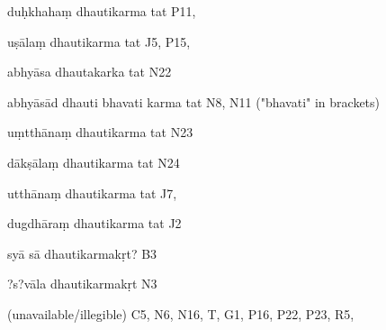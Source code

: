 \begin{marma}[hp02_009]
\begin{marma}[hp02_011]
\begin{marma}[hp02_24d]
\item[duḥkhahaṃ dhautikarma tat] P11, 
\item[uṣālaṃ dhautikarma tat] J5, P15, 
\item[abhyāsa dhautakarka tat] N22
\item[abhyāsād dhauti bhavati karma tat] N8, N11 ("bhavati" in brackets)
\item[uṃtthānaṃ dhautikarma tat] N23
\item[dākṣālaṃ dhautikarma tat] N24
\item[utthānaṃ dhautikarma tat] J7,
\item[dugdhāraṃ dhautikarma tat] J2
\item[syā sā dhautikarmakṛt?] B3
\item[?s?vāla dhautikarmakṛt] N3
\item[(unavailable/illegible)] C5, N6, N16, T, G1, P16, P22, P23, R5,
  \begin{description}

    \end{description}
 \end{marma}


\end{marma}
\end{marma}
